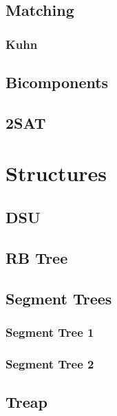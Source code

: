 \documentclass[a4paper,twocolumn]{extarticle}
\begin{document}
{        \subsection{Matching}
        \subsubsection{Kuhn}
        
        \subsection{Bicomponents}
        
        \subsection{2SAT}
        

        \section{Structures}
        \subsection{DSU}
        
        \subsection{RB Tree}
        
        \subsection{Segment Trees}
        \subsubsection{Segment Tree 1}
        
        \subsubsection{Segment Tree 2}
        
        \subsection{Treap}
        
}
\end{document}
